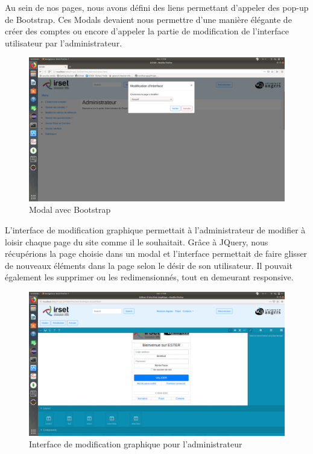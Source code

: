 Au sein de nos pages, nous avons défini des liens permettant d'appeler des pop-up de Bootstrap. Ces Modals devaient nous permettre d'une manière élégante de créer des comptes ou encore d'appeler la partie de modification de l'interface utilisateur par l'administrateur.

\begin{figure}[H]
    \begin{center}
	\includegraphics[scale=0.2,trim=2.8cm 0cm 0.8cm 5.3cm, clip=true]{img/modal}
    \end{center}
    \caption{Modal avec Bootstrap}
\end{figure}

L'interface de modification graphique permettait à l'administrateur de modifier à loisir chaque page du site comme il le souhaitait. Grâce à JQuery, nous récupérions la page choisie dans un modal et l'interface permettait de faire glisser de nouveaux éléments dans la page selon le désir de son utilisateur. Il pouvait également les supprimer ou les redimensionnés, tout en demeurant responsive.

\begin{figure}[H]
    \begin{center}
	\includegraphics[scale=0.2,trim=2.8cm 0cm 0.8cm 4.0cm, clip=true]{img/interface}
    \end{center}
    \caption{Interface de modification graphique pour l'administrateur}
\end{figure}


